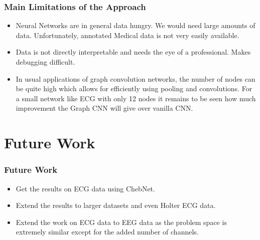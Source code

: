 \documentclass{beamer}
\begin{document}
\begin{frame}
  \frametitle{Main Limitations of the Approach}
  \begin{itemize}
  \item Neural Networks are in general data hungry. We would need large amounts of data. Unfortunately, annotated Medical data is not very easily available.
  \item Data is not directly interpretable and needs the eye of a professional. Makes debugging difficult.
  \item In usual applications of graph convolution networks, the number of nodes can be quite high which allows for efficiently using pooling and convolutions. For a small network like ECG with only 12 nodes it remains to be seen how much improvement the Graph CNN will give over vanilla CNN.
  \end{itemize}
\end{frame}

\section{Future Work}
\begin{frame}
  \frametitle{Future Work}
  \begin{itemize}
  \item Get the results on ECG data using ChebNet.
  \item Extend the results to larger datasets and even Holter ECG data.
  \item Extend the work on ECG data to EEG data as the problem space is extremely similar except for the added number of channels.
  \end{itemize}
\end{frame}
\end{document}
